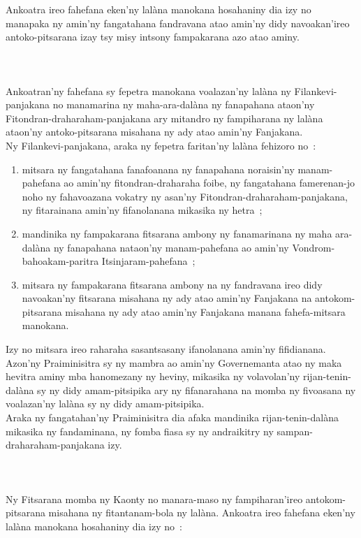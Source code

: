 \documentclass[12pt]{article}
\newcounter{laharana}
\newcommand{\andininy}[0]{
  \paragraph{%
    \NoCaseChange{%
      Andininy~\addtocounter{laharana}{1}\thelaharana.}\label{and:\thelaharana}~%
  }%
}
\begin{document}
\noindent
Ankoatra ireo fahefana eken'ny lalàna manokana hosahaniny dia izy no manapaka ny
amin'ny fangatahana fandravana atao amin'ny didy navoakan'ireo antoko-pitsarana
izay tsy misy intsony fampakarana azo atao aminy.

\andininy{}Ankoatran'ny fahefana sy fepetra manokana voalazan'ny lalàna ny
Filankevi-panjakana no manamarina ny maha-ara-dalàna ny fanapahana ataon'ny
Fitondran-draharaham-panjakana ary mitandro ny fampiharana ny lalàna ataon'ny
antoko-pitsarana misahana ny ady atao amin'ny Fanjakana.\\

\noindent
Ny Filankevi-panjakana, araka ny fepetra faritan'ny lalàna fehizoro no~:

\begin{enumerate}
\item mitsara ny fangatahana fanafoanana ny fanapahana noraisin'ny
  manam-pahefana ao amin'ny fitondran-draharaha foibe, ny fangatahana
  famerenan-jo noho ny fahavoazana vokatry ny asan'ny
  Fitondran-draharaham-panjakana, ny fitarainana amin'ny fifanolanana mikasika
  ny hetra~;

\item mandinika ny fampakarana fitsarana ambony ny fanamarinana ny maha
  ara-dalàna ny fanapahana nataon'ny manam-pahefana ao amin'ny
  Vondrom-bahoakam-paritra Itsinjaram-pahefana~;

\item mitsara ny fampakarana fitsarana ambony na ny fandravana ireo didy
  navoakan'ny fitsarana misahana ny ady atao amin'ny Fanjakana na
  antokom-pitsarana misahana ny ady atao amin'ny Fanjakana manana fahefa-mitsara
  manokana.
\end{enumerate}
\noindent
Izy no mitsara ireo raharaha sasantsasany ifanolanana amin'ny fifidianana.\\

\noindent
Azon'ny Praiminisitra sy ny mambra ao amin'ny Governemanta atao ny maka hevitra
aminy mba hanomezany ny heviny, mikasika ny volavolan'ny rijan-tenin-dalàna sy
ny didy amam-pitsipika ary ny fifanarahana na momba ny fivoasana ny voalazan'ny
lalàna sy ny didy amam-pitsipika.\\

\noindent
Araka ny fangatahan'ny Praiminisitra dia afaka mandinika rijan-tenin-dalàna
mikasika ny fandaminana, ny fomba fiasa sy ny andraikitry ny
sampan-draharaham-panjakana izy.

\andininy{}Ny Fitsarana momba ny Kaonty no manara-maso ny fampiharan'ireo
antokom-pitsarana misahana ny fitantanam-bola ny lalàna.  Ankoatra ireo fahefana
eken'ny lalàna manokana hosahaniny dia izy no~:
\end{document}

